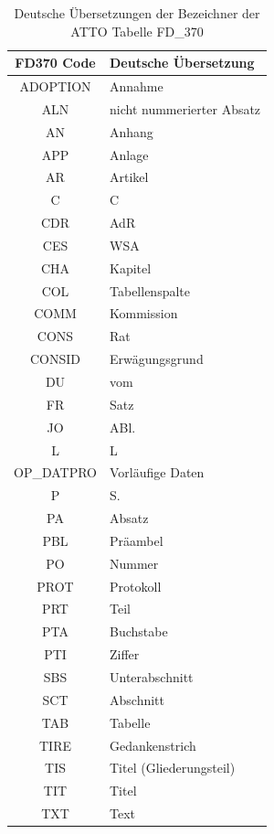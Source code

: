     \begin{table}[H]
        \centering
        \begin{tabular}{|c|l|}\hline
            FD370 Code & Deutsche Übersetzung \\\hline \hline
            ADOPTION & Annahme \\\hline
            ALN & nicht nummerierter Absatz \\\hline
            AN & Anhang \\\hline
            APP & Anlage \\\hline
            AR & Artikel \\\hline
            C & C \\\hline
            CDR & AdR \\\hline
            CES & WSA \\\hline
            CHA & Kapitel \\\hline
            COL & Tabellenspalte \\\hline
            COMM & Kommission \\\hline
            CONS & Rat \\\hline
            CONSID & Erwägungsgrund \\\hline
            DU & vom \\\hline
            FR & Satz \\\hline
            JO & ABl. \\\hline
            L & L \\\hline
            OP\_DATPRO & Vorläufige Daten \\\hline
            P & S. \\\hline
            PA & Absatz \\\hline
            PBL & Präambel \\\hline
            PO & Nummer \\\hline
            PROT & Protokoll \\\hline
            PRT & Teil \\\hline
            PTA & Buchstabe \\\hline
            PTI & Ziffer \\\hline
            SBS & Unterabschnitt \\\hline
            SCT & Abschnitt \\\hline
            TAB & Tabelle \\\hline
            TIRE & Gedankenstrich \\\hline
            TIS & Titel (Gliederungsteil) \\\hline
            TIT & Titel \\\hline
            TXT & Text \\\hline
        \end{tabular}
        \caption{Deutsche Übersetzungen der Bezeichner der ATTO Tabelle FD\_370}
        \label{tab:fd_370}
    \end{table}
    

